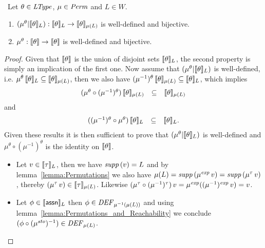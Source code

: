 \documentclass[12pt,a4paper]{report}
\newcommand{\sexp}{\nstyle{exp}}
\newcommand{\ssto}{\nstyle{sto}}
\newcommand{\DEF}{\nstyle{DEF}}
\begin{document}
\begin{lemma} \
  Let $\theta \in \mathit{LType}$, $\mu\in\mathit{Perm}$ and $L\in W$.
  \begin{enumerate}
    \item $(\mu^\theta|\llbracket\theta\rrbracket_L): \llbracket\theta\rrbracket_L \to \llbracket\theta\rrbracket_{\mu(L)}$ is
          well-defined and bijective.
    \item $\mu^\theta: \llbracket\theta\rrbracket \to \llbracket\theta\rrbracket$ is well-defined and bijective.
  \end{enumerate}
\end{lemma}

\begin{proof}
  Given that $\llbracket\theta\rrbracket$ is the union of disjoint sets $\llbracket\theta\rrbracket_L$, the second
  property is simply an implication of the first one. Now assume that $(\mu^\theta|\llbracket\theta\rrbracket_L)$
  is well-defined, i.e. $\mu^\theta\,\llbracket\theta\rrbracket_L \subseteq \llbracket\theta\rrbracket_{\mu(L)}$, then
  we also have $(\mu^{-1})^\theta\,\llbracket\theta\rrbracket_{\mu(L)} \subseteq \llbracket\theta\rrbracket_L$, which
  implies
  \[\begin{array}{rcl}
    (\mu^\theta \circ (\mu^{-1})^\theta)\,\llbracket\theta\rrbracket_{\mu(L)} &\subseteq& \llbracket\theta\rrbracket_{\mu(L)}
  \end{array}\]
  and
  \[\begin{array}{rcl}
    ((\mu^{-1})^\theta \circ \mu^\theta)\,\llbracket\theta\rrbracket_L &\subseteq& \llbracket\theta\rrbracket_L.
  \end{array}\]
  Given these results it is then sufficient to prove that $(\mu^\theta|\llbracket\theta\rrbracket_L)$ is
  well-defined and $\mu^\theta \circ (\mu^{-1})^\theta$ is the identity on $\llbracket\theta\rrbracket$.
  \begin{itemize}
    \item Let $v \in \llbracket\tau\rrbracket_L$, then we have $\mathit{supp}\,(v) = L$ and by lemma~\ref{lemma:Permutations}
          we also have $\mu(L) = \supp{\mu^\sexp\,v} = \supp{\mu^\tau\,v}$, thereby
          $(\mu^\tau\,v) \in \llbracket\tau\rrbracket_{\mu(L)}$. Likewise
          $(\mu^\tau \circ(\mu^{-1})^\tau)\,v = \mu^\sexp((\mu^{-1})^\sexp\,v) = v$.

    \item Let $\phi \in \llbracket\mathsf{assn}\rrbracket_L$ then $\phi \in \DEF_{\mu^{-1}(\mu(L))}$ and using
          lemma~\ref{lemma:Permutations_and_Reachability} we conclude $(\phi\circ(\mu^\ssto)^{-1})\in\DEF_{\mu(L)}$.


\end{itemize}
\end{proof}
\end{document}
